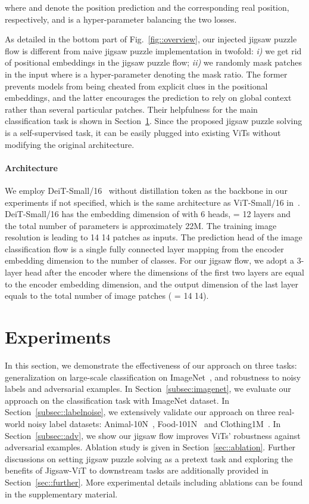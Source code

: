 \documentclass{article}
\begin{document}
where  and  denote the position prediction and the corresponding real position, respectively, and  is a hyper-parameter balancing the two losses.

As detailed in the bottom part of Fig.~\ref{fig::overview}, our injected jigsaw puzzle flow is different from naive jigsaw puzzle implementation in twofold: 
\textit{i)} we get rid of positional embeddings in the jigsaw puzzle flow; 
\textit{ii)} we randomly mask  patches in the input where  is a hyper-parameter denoting the mask ratio. 
The former prevents models from being cheated from explicit clues in the positional embeddings, and the latter encourages the prediction to rely on global context rather than several particular patches. 
Their helpfulness for the main classification task is shown in Section~\ref{sec::experiments}.
Since the proposed jigsaw puzzle solving is a self-supervised task, it can be easily plugged into existing ViTs without modifying the original architecture.

\paragraph{Architecture} 
We employ DeiT-Small/16~\cite{touvron2021training} without distillation token as the backbone in our experiments if not specified, which is the same architecture as ViT-Small/16 in~\cite{dosovitskiy2021an}. DeiT-Small/16 has the embedding dimension of  with 6 heads,  = 12 layers and the total number of parameters is approximately 22M. 
The training image resolution is  leading to 14  14 patches as inputs. 
The prediction head of the image classification flow is a single fully connected layer mapping from the encoder embedding dimension to the number of classes.
For our jigsaw flow, we adopt a 3-layer  head after the encoder where the dimensions of the first two layers are equal to the encoder embedding dimension, and the output dimension of the last layer equals to the total number of image patches ( = 14  14).

    
\section{Experiments}
\label{sec::experiments}


In this section, we demonstrate the effectiveness of our approach on three tasks: generalization on large-scale classification on ImageNet~\cite{deng2009imagenet}, and robustness to noisy labels and adversarial examples. 
In Section~\ref{subsec:imagenet}, we evaluate our approach on the classification task with ImageNet dataset. 
In Section~\ref{subsec::labelnoise}, we extensively validate our approach on three real-world noisy label datasets: Animal-10N~\cite{song2019selfie}, Food-101N~\cite{lee2018cleannet} and Clothing1M~\cite{xiao2015learning}. 
In Section~\ref{subsec::adv}, we show our jigsaw flow improves ViTs' robustness against adversarial examples.
Ablation study is given in Section~\ref{sec::ablation}. 
{Further discussions on setting jigsaw puzzle solving as a pretext task and exploring the benefits of Jigsaw-ViT to downstream tasks are additionally provided in Section~\ref{sec::further}.} 
More experimental details including ablations can be found in the supplementary material.
    
\end{document}

